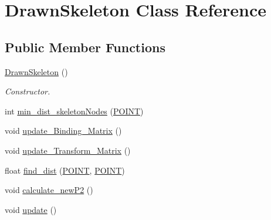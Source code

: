 \hypertarget{classDrawnSkeleton}{\section{\-Drawn\-Skeleton \-Class \-Reference}
\label{classDrawnSkeleton}
}
\subsection*{\-Public \-Member \-Functions}
\begin{DoxyCompactItemize}
\item 
\hypertarget{classDrawnSkeleton_a6c8ea8126a39c2f27eec0463c067f874}{\hyperlink{classDrawnSkeleton_a6c8ea8126a39c2f27eec0463c067f874}{\-Drawn\-Skeleton} ()}\label{classDrawnSkeleton_a6c8ea8126a39c2f27eec0463c067f874}

\begin{DoxyCompactList}\small\item\em \-Constructor. \end{DoxyCompactList}\item 
int \hyperlink{classDrawnSkeleton_aa5778650debd810ce52d65cac4a46482}{min\-\_\-dist\-\_\-skeleton\-Nodes} (\hyperlink{structPOINT}{\-P\-O\-I\-N\-T})
\item 
void \hyperlink{classDrawnSkeleton_a4b0de2a84fda7555e40f2b1cdef5ee83}{update\-\_\-\-Binding\-\_\-\-Matrix} ()
\item 
void \hyperlink{classDrawnSkeleton_aa8d84a14ae641abe8e6d59ec0aefb5dd}{update\-\_\-\-Transform\-\_\-\-Matrix} ()
\item 
float \hyperlink{classDrawnSkeleton_a121370d515d5cc1d217f5ef2db53513e}{find\-\_\-dist} (\hyperlink{structPOINT}{\-P\-O\-I\-N\-T}, \hyperlink{structPOINT}{\-P\-O\-I\-N\-T})
\item 
void \hyperlink{classDrawnSkeleton_ab10e74a5a78dca908e9ee05548ba0036}{calculate\-\_\-new\-P2} ()
\item 
void \hyperlink{classDrawnSkeleton_ad38f1661673431a72236c882c01e1011}{update} ()
\end{DoxyCompactItemize}
